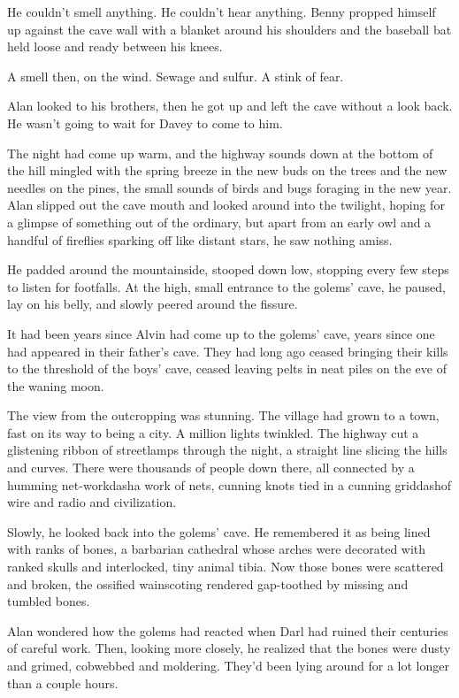 He couldn't smell anything.  He couldn't hear anything.  Benny propped
himself up against the cave wall with a blanket around his shoulders
and the baseball bat held loose and ready between his knees.

A smell then, on the wind.  Sewage and sulfur.  A stink of fear.

Alan looked to his brothers, then he got up and left the cave without
a look back.  He wasn't going to wait for Davey to come to him.

The night had come up warm, and the highway sounds down at the bottom
of the hill mingled with the spring breeze in the new buds on the
trees and the new needles on the pines, the small sounds of birds and
bugs foraging in the new year.  Alan slipped out the cave mouth and
looked around into the twilight, hoping for a glimpse of something out
of the ordinary, but apart from an early owl and a handful of
fireflies sparking off like distant stars, he saw nothing amiss.

He padded around the mountainside, stooped down low, stopping every
few steps to listen for footfalls.  At the high, small entrance to the
golems' cave, he paused, lay on his belly, and slowly peered around
the fissure.

It had been years since Alvin had come up to the golems' cave, years
since one had appeared in their father's cave.  They had long ago
ceased bringing their kills to the threshold of the boys' cave, ceased
leaving pelts in neat piles on the eve of the waning moon.

The view from the outcropping was stunning.  The village had grown to
a town, fast on its way to being a city.  A million lights twinkled. 
The highway cut a glistening ribbon of streetlamps through the night,
a straight line slicing the hills and curves.  There were thousands of
people down there, all connected by a humming net-workdash{}a work of
nets, cunning knots tied in a cunning griddash{}of wire and radio and
civilization.

Slowly, he looked back into the golems' cave.  He remembered it as
being lined with ranks of bones, a barbarian cathedral whose arches
were decorated with ranked skulls and interlocked, tiny animal tibia. 
Now those bones were scattered and broken, the ossified wainscoting
rendered gap-toothed by missing and tumbled bones.

Alan wondered how the golems had reacted when Darl had ruined their
centuries of careful work.  Then, looking more closely, he realized
that the bones were dusty and grimed, cobwebbed and moldering.  They'd
been lying around for a lot longer than a couple hours.

